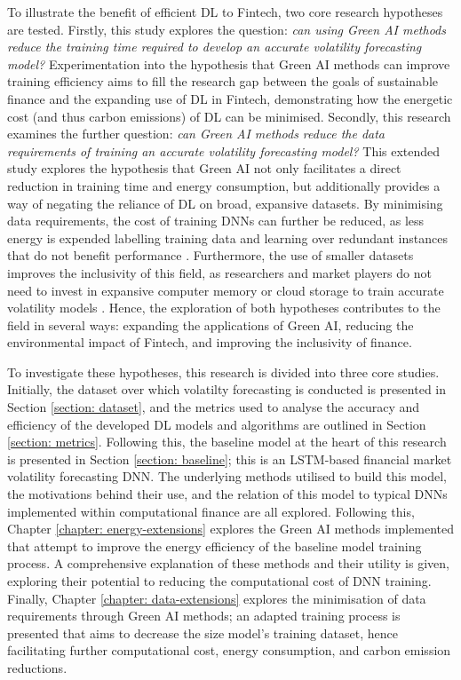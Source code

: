 \documentclass[a4paper, 11pt]{report}
\begin{document}
    To illustrate the benefit of efficient DL to Fintech, two core research hypotheses are tested. Firstly, this study explores the question: \emph{can using Green AI methods reduce the training time required to develop an accurate volatility forecasting model?} Experimentation into the hypothesis that Green AI methods can improve training efficiency aims to fill the research gap between the goals of sustainable finance and the expanding use of DL in Fintech, demonstrating how the energetic cost (and thus carbon emissions) of DL can be minimised. Secondly, this research examines the further question: \emph{can Green AI methods reduce the data requirements of training an accurate volatility forecasting model?} This extended study explores the hypothesis that Green AI not only facilitates a direct reduction in training time and energy consumption, but additionally provides a way of negating the reliance of DL on broad, expansive datasets. By minimising data requirements, the cost of training DNNs can further be reduced, as less energy is expended labelling training data and learning over redundant instances that do not benefit performance \citep{schwartz-2019}. Furthermore, the use of smaller datasets improves the inclusivity of this field, as researchers and market players do not need to invest in expansive computer memory or cloud storage to train accurate volatility models \citep{strubell-2019}. Hence, the exploration of both hypotheses contributes to the field in several ways: expanding the applications of Green AI, reducing the environmental impact of Fintech, and improving the inclusivity of finance.

    To investigate these hypotheses, this research is divided into three core studies. Initially, the dataset over which volatilty forecasting is conducted is presented in Section \ref{section: dataset}, and the metrics used to analyse the accuracy and efficiency of the developed DL models and algorithms are outlined in Section \ref{section: metrics}. Following this, the baseline model at the heart of this research is presented in Section \ref{section: baseline}; this is an LSTM-based financial market volatility forecasting DNN. The underlying methods utilised to build this model, the motivations behind their use, and the relation of this model to typical DNNs implemented within computational finance are all explored. Following this, Chapter \ref{chapter: energy-extensions} explores the Green AI methods implemented that attempt to improve the energy efficiency of the baseline model training process. A comprehensive explanation of these methods and their utility is given, exploring their potential to reducing the computational cost of DNN training. Finally, Chapter \ref{chapter: data-extensions} explores the minimisation of data requirements through Green AI methods; an adapted training process is presented that aims to decrease the size model's training dataset, hence facilitating further computational cost, energy consumption, and carbon emission reductions.
\end{document}
